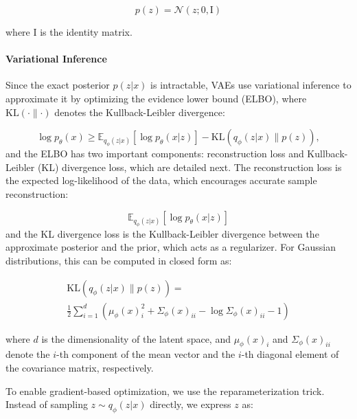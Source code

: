 \documentclass{ieeeaccess}
\begin{document}
\begin{equation}
p(z) = \mathcal{N}(z; 0, \mathrm{I})
\end{equation}

where $\mathrm{I}$ is the identity matrix.

\paragraph{Variational Inference} Since the exact posterior $p(z | x)$ is intractable, VAEs use variational inference to approximate it by optimizing the evidence lower bound (ELBO), where $\text{KL}(\cdot \parallel \cdot)$ denotes the Kullback-Leibler divergence:

\begin{equation}
\log p_\theta(x) \geq \mathbb{E}_{q_\phi(z | x)} \left[ \log p_\theta(x | z) \right] - \text{KL}(q_\phi(z | x) \parallel p(z)),
\end{equation}
and the ELBO has two important components: reconstruction loss and Kullback-Leibler (KL) divergence loss, which are detailed next. The reconstruction loss is the expected log-likelihood of the data, which encourages accurate sample reconstruction:

\begin{equation}
\mathbb{E}_{q_\phi(z | x)} \left[ \log p_\theta(x | z) \right]
\end{equation}
and the KL divergence loss is the Kullback-Leibler divergence between the approximate posterior and the prior, which acts as a regularizer. For Gaussian distributions, this can be computed in closed form as:

\begin{equation}
\begin{aligned}
\text{KL}(q_\phi(z | x) \parallel p(z))
=  \\
\frac{1}{2} \sum_{i=1}^{d} \left( \mu_\phi(x)_i^2 + \Sigma_\phi(x)_{ii} - \log \Sigma_\phi(x)_{ii} - 1 \right)
\end{aligned}
\end{equation}

where $d$ is the dimensionality of the latent space, and $\mu_\phi(x)_i$ and $\Sigma_\phi(x)_{ii}$ denote the $i$-th component of the mean vector and the $i$-th diagonal element of the covariance matrix, respectively.

To enable gradient-based optimization, we use the reparameterization trick. Instead of sampling $z \sim q_\phi(z | x)$ directly, we express $z$ as:
\end{document}
